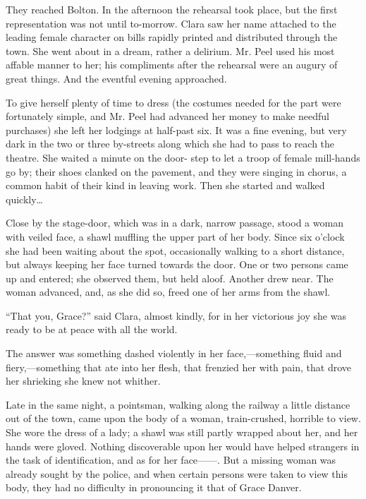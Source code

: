 They reached Bolton. In the afternoon the rehearsal took place, but the
first representation was not until to-morrow. Clara saw her name
attached to the leading female character on bills rapidly printed and
distributed through the town. She went about in a dream, rather a
delirium. Mr. Peel used his most affable manner to her; his compliments
after the rehearsal were an augury of great things. And the eventful
evening approached.

{\protect\hypertarget{214}{}{}}To give herself plenty of time to dress
(the costumes needed for the part were fortunately simple, and Mr. Peel
had advanced her money to make needful purchases) she left her lodgings
at half-past six. It was a fine evening, but very dark in the two or
three by-streets along which she had to pass to reach the theatre. She
waited a minute on the door- step to let a troop of female mill-hands go
by; their shoes clanked on the pavement, and they were singing in
chorus, a common habit of their kind in leaving work. Then she started
and walked quickly\ldots{}

Close by the stage-door, which was in a dark, narrow passage, stood a
woman with veiled face, a shawl muffling the upper part of her body.
Since six o'clock she had been waiting about the spot, occasionally
walking to a short distance, but always keeping her face turned towards
the door. One or two persons came up and entered; she observed them, but
held aloof. Another drew near. The woman advanced, and, as she did so,
freed one of her arms from the shawl.

{\protect\hypertarget{215}{}{}}``That you, Grace?'' said Clara, almost
kindly, for in her victorious joy she was ready to be at peace with all
the world.

The answer was something dashed violently in her face,---something fluid
and fiery,---something that ate into her flesh, that frenzied her with
pain, that drove her shrieking she knew not whither.

Late in the same night, a pointsman, walking along the railway a little
distance out of the town, came upon the body of a woman, train-crushed,
horrible to view. She wore the dress of a lady; a shawl was still partly
wrapped about her, and her hands were gloved. Nothing discoverable upon
her would have helped strangers in the task of identification, and as
for her {face{{------}}.} But a missing woman was already sought by the
police, and when certain persons were taken to view this body, they had
no difficulty in pronouncing it that of Grace Danver.
